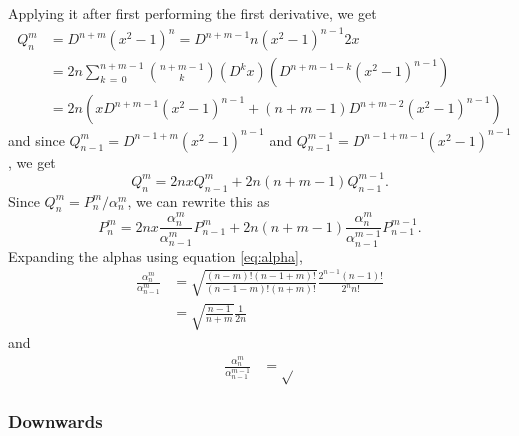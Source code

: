 \documentclass[12pt]{article}
\begin{document}
Applying it after first performing the first derivative, we get
\begin{align}
  Q_n^m &= D^{n+m}(x^2 - 1)^n = D^{n + m - 1}n(x^2 - 1)^{n-1}2x\\ 
  &= 2n\sum_{k\,=\,0}^{n+m-1}{n+m-1\choose k}\left(D^k x\right)\left(D^{n+m-1-k}(x^2 - 1)^{n-1}\right)\\ 
  &= 2n\left(xD^{n+m-1}(x^2 - 1)^{n-1} + (n+m-1)D^{n+m-2}(x^2-1)^{n-1}\right)
\end{align}
and since $Q_{n-1}^{m} = D^{n-1+m}(x^2-1)^{n-1}$ and $Q_{n-1}^{m-1}=D^{n-1+m-1}(x^2-1)^{n-1}$, we get
\begin{equation}
  Q_n^m = 2nxQ_{n-1}^m + 2n(n+m-1)Q_{n-1}^{m-1}.
\end{equation}
Since $Q_n^m=P_n^m/\alpha_n^m$, we can rewrite this as 
\begin{equation}
  P_n^m = 2nx\frac{\alpha_n^m}{\alpha_{n-1}^m}P_{n-1}^m + 2n(n+m-1)\frac{\alpha_n^m}{\alpha_{n-1}^{m-1}}P_{n-1}^{m-1}.
\end{equation}
Expanding the alphas using equation \eqref{eq:alpha},
\begin{align}
  \frac{\alpha_n^m}{\alpha_{n-1}^m} &= \sqrt{\frac{(n-m)!(n-1+m)!}{(n-1-m)!(n+m)!}}\frac{2^{n-1}(n-1)!}{2^nn!}\\ 
                                    &= \sqrt{\frac{n-1}{n+m}}\frac{1}{2n}
\end{align}
and
\begin{align}
  \frac{\alpha_n^m}{\alpha_{n-1}^{m-1}} &= \sqrt{}
\end{align}

\subsubsection{Downwards}
%


\printbibliography
\end{document}
